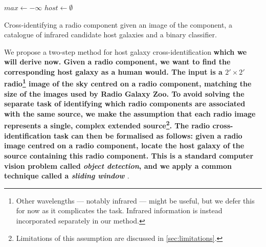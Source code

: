 \documentclass[fleqn,usenatbib,usedcolumn]{mnras}
\newcommand{\edited}[1]{{\bf {#1}}}
\begin{document}
    \begin{algorithm}

        $max \leftarrow -\infty$\;
        $host \leftarrow \emptyset$\;

        \caption{Cross-identifying a radio component given an image of the component, a catalogue of infrared candidate host galaxies and a binary classifier.}
        \label{alg:xid}
    \end{algorithm}

    We propose a two-step method for host galaxy cross-identification \edited{which we will derive now. Given a radio component, we want to find the corresponding host galaxy as a human would. The input is a $2' \times 2'$ radio\footnote{Other wavelengths --- notably infrared --- might be useful, but we defer this for now as it complicates the task. Infrared information is instead incorporated separately in our method.} image of the sky centred on a radio component, matching the size of the images used by Radio Galaxy Zoo. To avoid solving the separate task of identifying which radio components are associated with the same source, we make the assumption that each radio image represents a single, complex extended source\footnote{Limitations of this assumption are discussed in \autoref{sec:limitations}.}. The radio cross-identification task can then be formalised as follows: given a radio image centred on a radio component, locate the host galaxy of the source containing this radio component. This is a standard computer vision problem called \emph{object detection}, and we apply a common technique called a \emph{sliding window} \citep{rowley1996facedetection}}.
\end{document}
